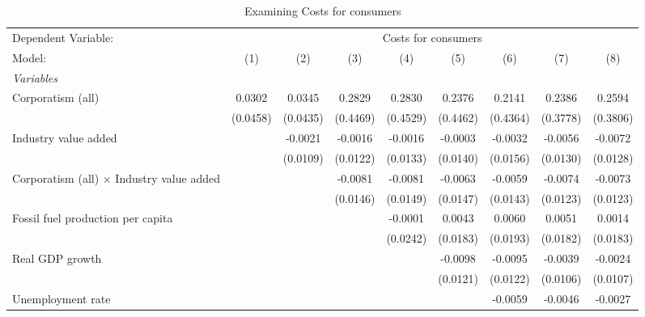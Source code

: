 
\begin{table}[htbp]
   \caption{Examining Costs for consumers}
   \centering
   \begin{tabular}{lcccccccc}
      \tabularnewline \midrule \midrule
      Dependent Variable: & \multicolumn{8}{c}{Costs for consumers}\\
      Model:                                           & (1)      & (2)      & (3)      & (4)      & (5)      & (6)      & (7)      & (8)\\  
      \midrule
      \emph{Variables}\\
      Corporatism (all)                                & 0.0302   & 0.0345   & 0.2829   & 0.2830   & 0.2376   & 0.2141   & 0.2386   & 0.2594\\   
                                                       & (0.0458) & (0.0435) & (0.4469) & (0.4529) & (0.4462) & (0.4364) & (0.3778) & (0.3806)\\   
      Industry value added                             &          & -0.0021  & -0.0016  & -0.0016  & -0.0003  & -0.0032  & -0.0056  & -0.0072\\   
                                                       &          & (0.0109) & (0.0122) & (0.0133) & (0.0140) & (0.0156) & (0.0130) & (0.0128)\\   
      Corporatism (all) $\times$ Industry value added  &          &          & -0.0081  & -0.0081  & -0.0063  & -0.0059  & -0.0074  & -0.0073\\   
                                                       &          &          & (0.0146) & (0.0149) & (0.0147) & (0.0143) & (0.0123) & (0.0123)\\   
      Fossil fuel production per capita                &          &          &          & -0.0001  & 0.0043   & 0.0060   & 0.0051   & 0.0014\\   
                                                       &          &          &          & (0.0242) & (0.0183) & (0.0193) & (0.0182) & (0.0183)\\   
      Real GDP growth                                  &          &          &          &          & -0.0098  & -0.0095  & -0.0039  & -0.0024\\   
                                                       &          &          &          &          & (0.0121) & (0.0122) & (0.0106) & (0.0107)\\   
      Unemployment rate                                &          &          &          &          &          & -0.0059  & -0.0046  & -0.0027\\   

\end{tabular}
\end{table}
